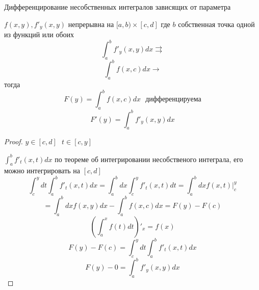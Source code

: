 \begin{title}[\Large]
  Дифференцирование несобственных интегралов зависящих от параметра
\end{title}

\begin{theorem}
  $f(x,y), f'_y (x,y)$ непрерывна на $[a,b) \times [c,d]$ где $b$ собственная
  точка одной из функций или обоих
  $$
  \int_a^b f'_y (x,y) dx \rightrightarrows
  $$
  $$
  \int_a^b f(x,c) dx \rightarrow
  $$
  тогда
  $$
  F(y) = \int_a^b f (x,c) dx ~~~ \text{дифференцируема}
  $$
  $$
  F'(y) = \int_a^b f'_y (x,y) dx
  $$
\end{theorem}

\begin{proof}
  $y \in [c,d] ~~~ t \in [c,y]$

  $\int_a^b f'_t(x,t)dx$ по теореме об интегрировании несобственого интеграла,
  его можно интегрировать на $[c,d]$
  $$
  \int_c^y dt \int_a^b f'_t(x, t) dx
  =
  \int_a^b dx \int_c^y f'_t(x,t) dt
  =
  \int_a^b dx f(x,t)|_c^y
  $$
  $$
  =
  \int_a^b dx f(x,y) dx - \int_a^b f(x,c)dx = F(y) - F(c)
  $$
  $$
  \left( \int_a^x f(t) dt \right)'_x = f(x)
  $$
  $$
  F(y) - F(c) = \int_c^y dt \int_a^b f'_t(x,t) dx
  $$
  $$
  F(y) - 0 = \int_a^b f'_y(x,y) dx
  $$
\end{proof}

